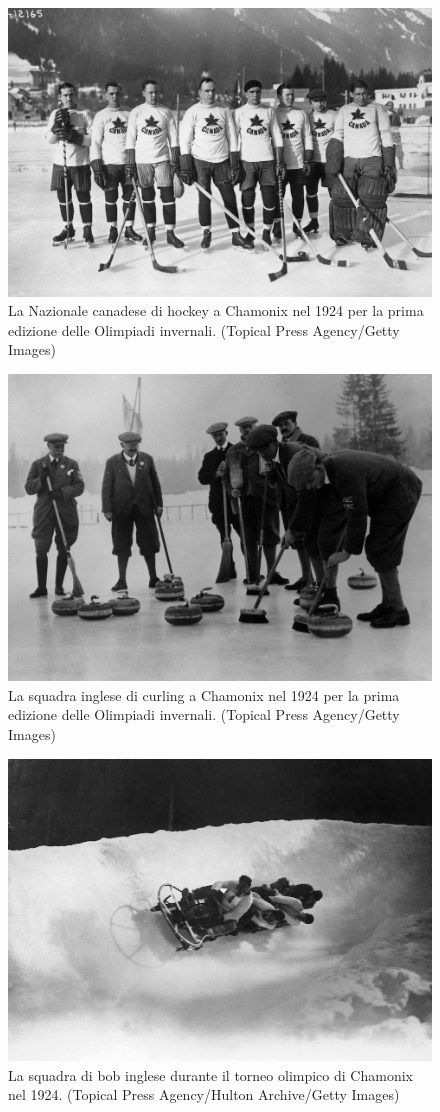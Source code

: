 \documentclass[
]{book}
\begin{document}
\begin{figure}
\includegraphics[width=0.8\linewidth]{images/IlPost/1924} \caption{La Nazionale canadese di hockey a Chamonix nel 1924 per la prima edizione delle Olimpiadi invernali. (Topical Press Agency/Getty Images)}\label{fig:unnamed-chunk-6}
\end{figure}

\begin{figure}
\includegraphics[width=0.8\linewidth]{images/IlPost/1924(2)} \caption{La squadra inglese di curling a Chamonix nel 1924 per la prima edizione delle Olimpiadi invernali. (Topical Press Agency/Getty Images)}\label{fig:unnamed-chunk-7}
\end{figure}

\begin{figure}
\includegraphics[width=0.8\linewidth]{images/IlPost/1924(3)} \caption{La squadra di bob inglese durante il torneo olimpico di Chamonix nel 1924. (Topical Press Agency/Hulton Archive/Getty Images)}\label{fig:unnamed-chunk-8}
\end{figure}
\end{document}
